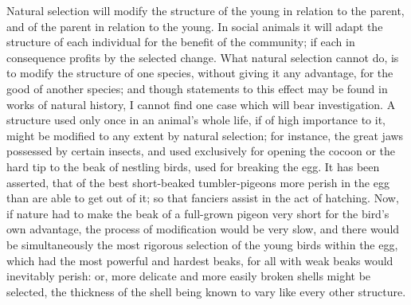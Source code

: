 \indent Natural selection will modify the structure of the young in relation to the parent, and of the parent in relation to the young. In social animals it will adapt the structure of each individual for the benefit of the community; if each in consequence profits by the selected change. What natural selection cannot do, is to modify the structure of one species, without giving it any advantage, for the good of another species; and though statements to this effect may be found in works of natural history, I cannot find one case which will bear investigation. A structure used only once in an animal's whole life, if of high importance to it, might be modified to any extent by natural selection; for instance, the great jaws possessed by certain insects, and used exclusively for opening the cocoon or the hard tip to the beak of nestling birds, used for breaking the egg. It has been asserted, that of the best short-beaked tumbler-pigeons more perish in the egg than are able to get out of it; so that fanciers assist in the act of hatching. Now, if nature had to make the beak of a full-grown pigeon very short for the bird's own advantage, the process of modification would be very slow, and there would be simultaneously the most rigorous selection of the young birds within the egg, which had the most powerful and hardest beaks, for all with weak beaks would inevitably perish: or, more delicate and more easily broken shells might be selected, the thickness of the shell being known to vary like every other structure. \\

